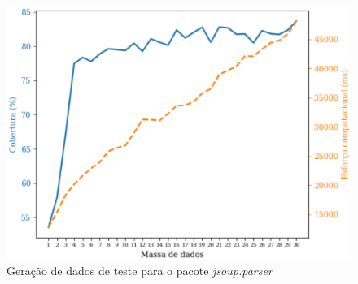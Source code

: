 \begin{figure}[H]
	\centering
	\includegraphics[scale=0.6]{figuras/jsoup.parser_generation.eps}
	\caption{Geração de dados de teste para o pacote \textit{jsoup.parser}}
	\label{fig:genJsoup}
\end{figure}

